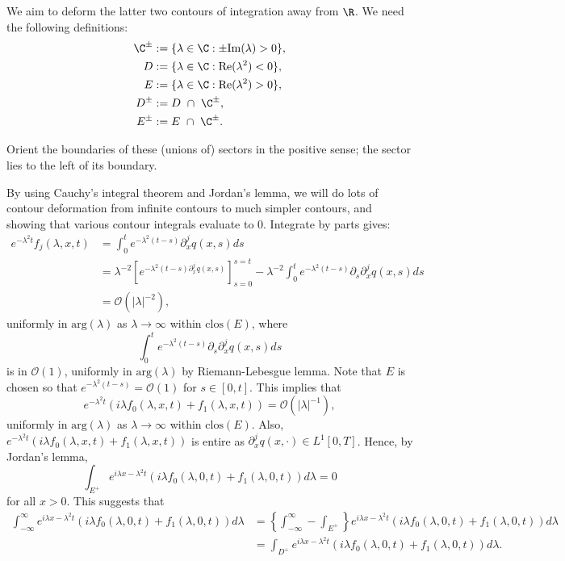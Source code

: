 \documentclass[11pt, oneside, a4paper]{article}
\begin{document}
We aim to deform the latter two contours of integration away from $\R$. We need the following definitions:
\begin{align*}
    \C^\pm &:= \{\lambda \in \C: \pm \mathrm{Im}(\lambda)>0\},\\
    D &:= \{\lambda \in \C: \mathrm{Re}(\lambda^2) < 0\}, \\
    E &:= \{\lambda \in \C: \mathrm{Re}(\lambda^2) > 0\},\\
    D^\pm & := D~\cap~\C^\pm,\\
    E^\pm & := E~\cap~\C^\pm.
\end{align*}

Orient the boundaries of these (unions of) sectors in the positive sense; the sector lies to the left of its boundary.

By using Cauchy's integral theorem and Jordan's lemma, we will do lots of contour deformation from infinite contours to much simpler contours, and showing that various contour integrals evaluate to 0. Integrate by parts gives:
\begin{align*}
    e^{-\lambda^2t}f_j(\lambda,x,t) &= \int_0^t e^{-\lambda^2(t-s)}\partial_x^j q(x,s)ds\\
    &= \lambda^{-2}\left[e^{-\lambda^2(t-s)\partial_x^jq(x,s)}\right]_{s=0}^{s=t} - \lambda^{-2}\int_0^te^{-\lambda^2(t-s)}\partial_s\partial_x^jq(x,s)ds\\
    &= \mathcal{O}(|\lambda|^{-2}),
\end{align*}
uniformly in $\mathrm{arg}(\lambda)$ as $\lambda \to \infty$ within $\mathrm{clos}(E)$, where
\[\int_0^te^{-\lambda^2(t-s)}\partial_s\partial_x^jq(x,s)ds\] is in $\mathcal{O}(1)$, uniformly in  $\mathrm{arg}(\lambda)$ by Riemann-Lebesgue lemma. Note that $E$ is chosen so that $e^{-\lambda^2(t-s)} = \mathcal{O}(1)$ for $s\in[0,t]$. This implies that
\[e^{-\lambda^2t}\left(i\lambda f_0(\lambda,x,t)+f_1(\lambda,x,t)\right) = \mathcal{O}(|\lambda|^{-1}),\]
uniformly in $\mathrm{arg}(\lambda)$ as $\lambda \to \infty$ within $\mathrm{clos}(E)$. Also, $e^{-\lambda^2t}\left(i\lambda f_0(\lambda,x,t)+f_1(\lambda,x,t)\right)$ is entire as $\partial_x^j q(x,\cdot) \in L^1[0,T]$. Hence, by Jordan's lemma, 
\[\int_{E^+} e^{i\lambda x - \lambda^2t} \left(i\lambda f_0(\lambda,0,t) + f_1(\lambda,0,t)\right)d\lambda = 0\]
for all $x > 0$. This suggests that
\begin{align*}
    \int_{-\infty}^\infty e^{i\lambda x - \lambda^2t} \left(i\lambda f_0(\lambda,0,t) + f_1(\lambda,0,t)\right)d\lambda &= \left\{\int_{-\infty}^\infty - \int_{E^+} \right\}e^{i\lambda x - \lambda^2t} \left(i\lambda f_0(\lambda,0,t) + f_1(\lambda,0,t)\right)d\lambda\\
    &= \int_{D^+} e^{i\lambda x - \lambda^2t} \left(i\lambda f_0(\lambda,0,t) + f_1(\lambda,0,t)\right)d\lambda.
\end{align*}
\end{document}
